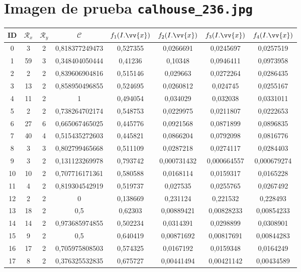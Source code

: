 \section{Imagen de prueba \texttt{calhouse\_236.jpg}}

\scriptsize
\begin{longtable}{|c|c|c|c|c|c|c|c|}
\hline
ID & $\mathscr{R}_x$ & $\mathscr{R}_y$ & $\mathscr{C}$ & $f_1(I.\vv{x})$ & $f_2(I.\vv{x})$ & $f_3(I.\vv{x})$ & $f_4(I.\vv{x})$ \\
\hline
0 & 3 & 2 & 0,818377249473 & 0,527355 & 0,0266691 & 0,0245697 & 0,0257519 \\
1 & 59 & 3 & 0,348404050444 & 0,41236 & 0,10348 & 0,0946411 & 0,0973958 \\
2 & 2 & 2 & 0,839606904816 & 0,515146 & 0,029663 & 0,0272264 & 0,0286435 \\
3 & 13 & 2 & 0,858950496855 & 0,524695 & 0,0260812 & 0,024745 & 0,0255167 \\
4 & 11 & 2 & 1 & 0,494054 & 0,034029 & 0,032038 & 0,0331011 \\
5 & 2 & 2 & 0,738264702174 & 0,548753 & 0,0229975 & 0,0211807 & 0,0222653 \\
6 & 27 & 6 & 0,665067465025 & 0,445776 & 0,0921568 & 0,0871899 & 0,0896835 \\
7 & 40 & 4 & 0,515435272603 & 0,445821 & 0,0866204 & 0,0792098 & 0,0816776 \\
8 & 3 & 3 & 0,802799465668 & 0,511109 & 0,0287218 & 0,0274117 & 0,0284403 \\
9 & 3 & 2 & 0,131123269978 & 0,793742 & 0,000731432 & 0,000664557 & 0,000679274 \\
10 & 10 & 2 & 0,707716171361 & 0,580588 & 0,0168114 & 0,0159317 & 0,0165228 \\
11 & 4 & 2 & 0,819304542919 & 0,519737 & 0,027535 & 0,0255765 & 0,0267492 \\
12 & 2 & 2 & 0 & 0,138669 & 0,231124 & 0,221532 & 0,228493 \\
13 & 18 & 2 & 0,5 & 0,62303 & 0,00889421 & 0,00828233 & 0,00854233 \\
14 & 14 & 2 & 0,973685974855 & 0,502234 & 0,0314391 & 0,0298899 & 0,0308901 \\
15 & 9 & 2 & 0,5 & 0,640419 & 0,00871692 & 0,00817691 & 0,00844283 \\
16 & 17 & 2 & 0,705975808503 & 0,574325 & 0,0167192 & 0,0159348 & 0,0164249 \\
17 & 8 & 2 & 0,376325532835 & 0,675727 & 0,00441494 & 0,00421142 & 0,00434589 \\

\end{longtable}
